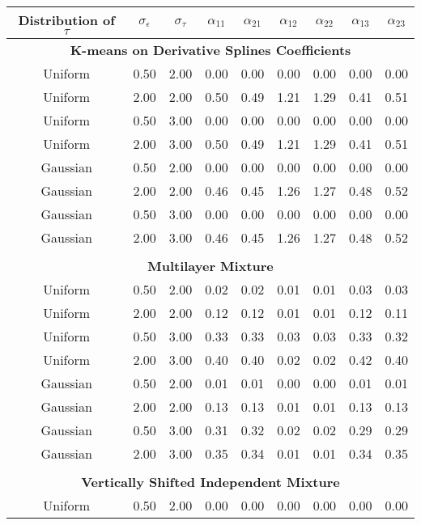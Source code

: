 \begin{table}[ht]
\begin{center}
\begin{tabular}{ccc|cccccc}
  \hline Distribution of $\tau$&$\sigma_{\epsilon}$&$\sigma_{\tau}$&$\alpha_{11}$&$\alpha_{21}$&$\alpha_{12}$&$\alpha_{22}$&$\alpha_{13}$&$\alpha_{23}$\\  \hline\multicolumn{9}{c}{\textbf{K-means on Derivative Splines Coefficients}}\\ Uniform & 0.50 & 2.00 & 0.00 & 0.00 & 0.00 & 0.00 & 0.00 & 0.00 \\ 
  Uniform & 2.00 & 2.00 & 0.50 & 0.49 & 1.21 & 1.29 & 0.41 & 0.51 \\ 
  Uniform & 0.50 & 3.00 & 0.00 & 0.00 & 0.00 & 0.00 & 0.00 & 0.00 \\ 
  Uniform & 2.00 & 3.00 & 0.50 & 0.49 & 1.21 & 1.29 & 0.41 & 0.51 \\ 
  Gaussian & 0.50 & 2.00 & 0.00 & 0.00 & 0.00 & 0.00 & 0.00 & 0.00 \\ 
  Gaussian & 2.00 & 2.00 & 0.46 & 0.45 & 1.26 & 1.27 & 0.48 & 0.52 \\ 
  Gaussian & 0.50 & 3.00 & 0.00 & 0.00 & 0.00 & 0.00 & 0.00 & 0.00 \\ 
  Gaussian & 2.00 & 3.00 & 0.46 & 0.45 & 1.26 & 1.27 & 0.48 & 0.52 \\ 
   \\ \multicolumn{9}{c}{\textbf{Multilayer Mixture}}\\Uniform & 0.50 & 2.00 & 0.02 & 0.02 & 0.01 & 0.01 & 0.03 & 0.03 \\ 
  Uniform & 2.00 & 2.00 & 0.12 & 0.12 & 0.01 & 0.01 & 0.12 & 0.11 \\ 
  Uniform & 0.50 & 3.00 & 0.33 & 0.33 & 0.03 & 0.03 & 0.33 & 0.32 \\ 
  Uniform & 2.00 & 3.00 & 0.40 & 0.40 & 0.02 & 0.02 & 0.42 & 0.40 \\ 
  Gaussian & 0.50 & 2.00 & 0.01 & 0.01 & 0.00 & 0.00 & 0.01 & 0.01 \\ 
  Gaussian & 2.00 & 2.00 & 0.13 & 0.13 & 0.01 & 0.01 & 0.13 & 0.13 \\ 
  Gaussian & 0.50 & 3.00 & 0.31 & 0.32 & 0.02 & 0.02 & 0.29 & 0.29 \\ 
  Gaussian & 2.00 & 3.00 & 0.35 & 0.34 & 0.01 & 0.01 & 0.34 & 0.35 \\ 
     \\ \multicolumn{9}{c}{\textbf{Vertically Shifted Independent Mixture}}\\Uniform & 0.50 & 2.00 & 0.00 & 0.00 & 0.00 & 0.00 & 0.00 & 0.00 \\ 

\end{tabular}
\end{center}
\end{table}
